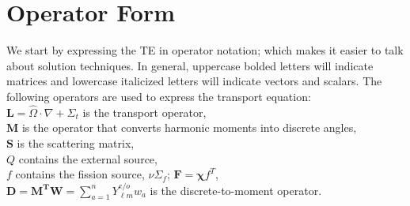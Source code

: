 \documentclass[12pt]{article}
\newcommand{\ve}[1]{\ensuremath{\mathbf{#1}}}
\newcommand{\Macro}{\ensuremath{\Sigma}}
\newcommand{\vOmega}{\ensuremath{\hat{\Omega}}}
\begin{document}
\section*{Operator Form}
We start by expressing the TE in operator notation; which makes it easier to talk about solution techniques. In general, uppercase bolded letters will indicate matrices and lowercase italicized letters will indicate vectors and scalars. The following operators are used to express the transport equation:\\
%
\hspace*{2em} $\mathbf{L} = \vOmega \cdot \nabla + \Macro_t$ is the transport operator, \\
\hspace*{2em} $\mathbf{M}$ is the operator that converts harmonic moments into discrete angles, \\
\hspace*{2em} $\mathbf{S}$ is the scattering matrix, \\
\hspace*{2em} $Q$ contains the external source,\\
\hspace*{2em} $f$ contains the fission source, $\nu \Macro_{f}$; $\mathbf{F} =\mathbf{\chi} f^{T}$, \\ 
\hspace*{2em} $\mathbf{D} = \ve{M^{T}}\ve{W} = \sum_{a=1}^{n}Y^{e/o}_{\ell m}w_{a}$ is the discrete-to-moment operator. 
\end{document}
